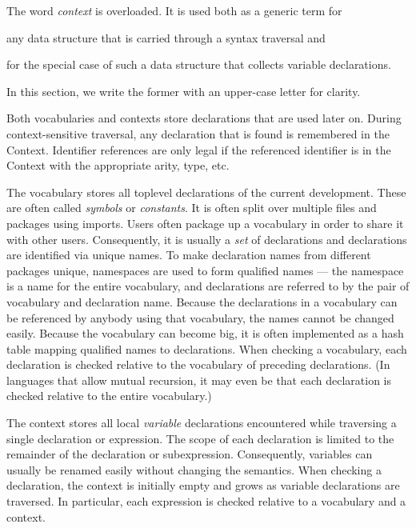 \begin{terminology}
The word \emph{context} is overloaded.
It is used both as a generic term for
\begin{compactitem}
\item any data structure that is carried through a syntax traversal and
\item for the special case of such a data structure that collects variable declarations.
\end{compactitem}
In this section, we write the former with an upper-case letter for clarity.
\end{terminology}

Both vocabularies and contexts store declarations that are used later on.
During context-sensitive traversal, any declaration that is found is remembered in the Context.
Identifier references are only legal if the referenced identifier is in the Context with the appropriate arity, type, etc.

The vocabulary stores all toplevel declarations of the current development.
These are often called \emph{symbols} or \emph{constants}.
It is often split over multiple files and packages using imports.
Users often package up a vocabulary in order to share it with other users.
Consequently, it is usually a \emph{set} of declarations and declarations are identified via unique names.
To make declaration names from different packages unique, namespaces are used to form qualified names --- the namespace is a name for the entire vocabulary, and declarations are referred to by the pair of vocabulary and declaration name.
Because the declarations in a vocabulary can be referenced by anybody using that vocabulary, the names cannot be changed easily.
Because the vocabulary can become big, it is often implemented as a hash table mapping qualified names to declarations.
When checking a vocabulary, each declaration is checked relative to the vocabulary of preceding declarations. (In languages that allow mutual recursion, it may even be that each declaration is checked relative to the entire vocabulary.)

The context stores all local \emph{variable} declarations encountered while traversing a single declaration or expression.
The scope of each declaration is limited to the remainder of the declaration or subexpression.
Consequently, variables can usually be renamed easily without changing the semantics.
When checking a declaration, the context is initially empty and grows as variable declarations are traversed.
In particular, each expression is checked relative to a vocabulary and a context.

